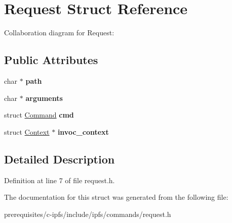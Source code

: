 \hypertarget{struct_request}{}\section{Request Struct Reference}
\label{struct_request}


Collaboration diagram for Request\+:
\subsection*{Public Attributes}
\begin{DoxyCompactItemize}
\item 
\mbox{\label{struct_request_a259fd2a7b4cc6d85c50327d8c7a32cc6}} 
char $\ast$ {\bfseries path}
\item 
\mbox{\label{struct_request_aeda97c5a474f1ffe19b93053b4ba0ce9}} 
char $\ast$ {\bfseries arguments}
\item 
\mbox{\label{struct_request_ab8f3a32962bba70c417326cec2a1d9ed}} 
struct \mbox{\hyperlink{struct_command}{Command}} {\bfseries cmd}
\item 
\mbox{\label{struct_request_abed9dfd8e340d68522d21370421d48f7}} 
struct \mbox{\hyperlink{struct_context}{Context}} $\ast$ {\bfseries invoc\+\_\+context}
\end{DoxyCompactItemize}


\subsection{Detailed Description}


Definition at line 7 of file request.\+h.



The documentation for this struct was generated from the following file\+:\begin{DoxyCompactItemize}
\item 
prerequisites/c-\/ipfs/include/ipfs/commands/request.\+h\end{DoxyCompactItemize}
